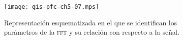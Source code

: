 \documentclass[a4paper,12pt]{article}
\begin{document}
\begin{figure}
	\begin{center}
		\texttt{[image: gis-pfc-ch5-07.mps]}
	\end{center}
	\caption[Parámetros del banco de filtros]{Representación esquematizada en el que se identifican los parámetros de la \textsc{fft} y su relación con respecto a la señal.}
	\label{fig:filter}
\end{figure}
% 
% 
\end{document}

